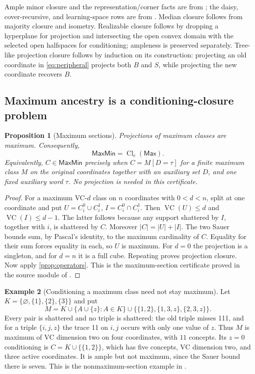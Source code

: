 \documentclass[11pt]{article}
\newtheorem{proposition}{Proposition}[section]
\theoremstyle{definition}
\newtheorem{example}[proposition]{Example}
\newcommand{\Max}{\mathsf{Max}}
\newcommand{\MaxMin}{\mathsf{MaxMin}}
\newcommand{\VC}{\operatorname{VC}}
\newcommand{\Cl}{\operatorname{Cl}}
\begin{document}
Ample minor closure and the representation/corner facts are from \cite{CCMW,Partition};
the daisy, cover-recursive, and learning-space rows are from
\cite{Daisy,Cover,Survey,MaxParents}. Median closure follows from majority closure and
isometry. Realizable closure follows by dropping a hyperplane for projection
and intersecting the open convex domain with the selected open halfspaces
for conditioning; ampleness is preserved separately. Tree-like projection
closure follows by induction on its construction: projecting an old coordinate
in \eqref{eq:peripheral} projects both $B$ and $S$, while projecting the new
coordinate recovers $B$.



\subsection{Maximum ancestry is a conditioning-closure problem}

\begin{proposition}[Maximum sections]\label{prop:max-sections}
Projections of maximum classes are maximum. Consequently,
\[
 \MaxMin=\Cl_c(\Max).
\]
Equivalently, $C\in\MaxMin$ precisely when $C=M[D=\tau]$ for a finite
maximum class $M$ on the original coordinates together with an auxiliary set
$D$, and one fixed auxiliary word $\tau$. No projection is needed in this
certificate.
\end{proposition}
\begin{proof}
For a maximum VC-$d$ class on $n$ coordinates with $0<d<n$, split at one
coordinate and put $U=C_i^0\cup C_i^1$, $I=C_i^0\cap C_i^1$.
Then $\VC(U)\le d$ and $\VC(I)\le d-1$. The latter follows because any
support shattered by $I$, together with $i$, is shattered by $C$.
Moreover $|C|=|U|+|I|$. The two Sauer bounds sum, by Pascal's identity,
to the maximum cardinality of $C$. Equality for their sum forces equality
in each, so $U$ is maximum. For $d=0$ the projection is a singleton, and
for $d=n$ it is a full cube. Repeating proves projection closure.
Now apply \cref{prop:operators}. This is the maximum-section certificate
proved in the source module of \cite{MaxSections}.
\end{proof}

\begin{example}[Conditioning a maximum class need not stay maximum]
Let $K=\{\varnothing,\{1\},\{2\},\{3\}\}$ and put
\[
 M=K\cup\{A\cup\{z\}:A\in K\}
   \cup\{\{1,2\},\{1,3,z\},\{2,3,z\}\}.
\]
Every pair is shattered and no triple is shattered: the old triple misses
111, and for a triple $\{i,j,z\}$ the trace 11 on $i,j$ occurs with only
one value of $z$. Thus $M$ is maximum of VC dimension two on four coordinates,
with $11$ concepts. Its $z=0$ conditioning is
$C=K\cup\{\{1,2\}\}$, which has five concepts, VC dimension two, and
three active coordinates. It is ample but not maximum, since the Sauer
bound there is seven. This is the nonmaximum-section example in
\cite{Partition}.
\end{example}
\end{document}
